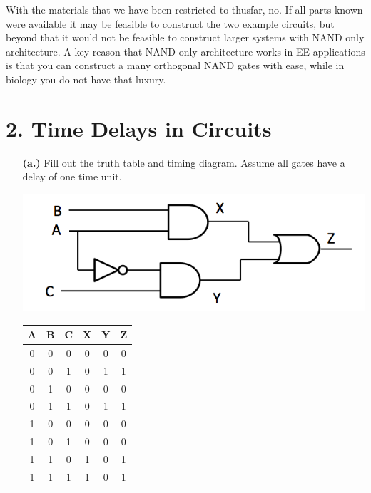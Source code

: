\documentclass[11pt]{article}
\begin{document}
\begin{itemize}
With the materials that we have been restricted to thusfar, no. 
If all parts known were available it may be feasible to construct the two example circuits, but beyond that it would not be feasible to construct larger systems with NAND only architecture.
 A key reason that NAND only architecture works in EE applications is that you can construct a many orthogonal NAND gates with ease, while in biology you do not have that luxury.

\end{itemize}

\section*{2. Time Delays in Circuits}

\begin{itemize}

\item[{\bf (a.)}] Fill out the truth table and timing diagram. Assume all gates have a delay of one time unit. 

{\centering
  \includegraphics[scale=0.5, trim = 0mm 0mm 7mm 0mm, clip]{ps_2_timing.png}\par
 }
{
  \centering
  \begin{tabular}{ c | c | c | c | c | c }
    A & B & C & X & Y & Z\\
  \hline
  0 & 0 & 0 & 0 & 0 & 0\\  
  0 & 0 & 1 & 0 & 1 & 1\\
  0 & 1 & 0 & 0 & 0 & 0\\
  0 & 1 & 1 & 0 & 1 & 1\\
  1 & 0 & 0 & 0 & 0 & 0\\
  1 & 0 & 1 & 0 & 0 & 0\\
  1 & 1 & 0 & 1 & 0 & 1\\
  1 & 1 & 1 & 1 & 0 & 1\\
  \end{tabular}
  \par
}


\end{itemize}
\end{document}
